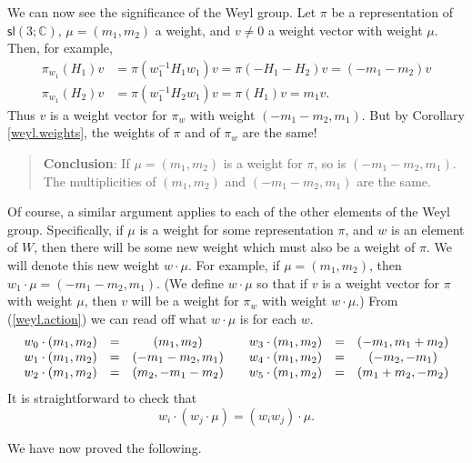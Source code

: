 \documentclass[12pt]{amsbook}
\theoremstyle{plain}
\numberwithin{equation}{chapter}
\numberwithin{theorem}{chapter}
\begin{document}
We can now see the significance of the Weyl group. Let $\pi$ be a
representation of $\mathsf{sl}\left(  3;\mathbb{C}\right)  $, $\mu
=(m_{1},m_{2})$ a weight, and $v\neq0$ a weight vector with weight $\mu$.
Then, for example,
\begin{align*}
\pi_{w_{1}}(H_{1})v  & =\pi(w_{1}^{-1}H_{1}w_{1})v=\pi(-H_{1}-H_{2}%
)v=(-m_{1}-m_{2})v\\
\pi_{w_{1}}(H_{2})v  & =\pi(w_{1}^{-1}H_{2}w_{1})v=\pi(H_{1})v=m_{1}v\text{.}%
\end{align*}
Thus $v$ is a weight vector for $\pi_{w}$ with weight $(-m_{1}-m_{2},m_{1})$.
But by Corollary \ref{weyl.weights}, the weights of $\pi$ and of $\pi_{w}$ are
the same!

\begin{quote}
\textbf{Conclusion}: If $\mu=(m_{1},m_{2})$ is a weight for $\pi$, so is
$(-m_{1}-m_{2},m_{1})$. The multiplicities of $(m_{1},m_{2})$ and
$(-m_{1}-m_{2},m_{1})$ are the same.
\end{quote}

Of course, a similar argument applies to each of the other elements of the
Weyl group. Specifically, if $\mu$ is a weight for some representation $\pi$,
and $w$ is an element of $W$, then there will be some new weight which must
also be a weight of $\pi$. We will denote this new weight $w\cdot\mu$. For
example, if $\mu=(m_{1},m_{2})$, then $w_{1}\cdot\mu=(-m_{1}-m_{2},m_{1})$.
(We define $w\cdot\mu$ so that if $v$ is a weight vector for $\pi$ with weight
$\mu$, then $v$ will be a weight for $\pi_{w}$ with weight $w\cdot\mu$.) From
(\ref{weyl.action}) we can read off what $w\cdot\mu$ is for each $w$.
\begin{equation}%
\begin{array}
[c]{ccccccc}%
w_{0}\cdot(m_{1},m_{2}) & = & (m_{1},m_{2}) &  & w_{3}\cdot(m_{1},m_{2}) & = &
(-m_{1},m_{1}+m_{2})\\
w_{1}\cdot(m_{1},m_{2}) & = & (-m_{1}-m_{2},m_{1}) &  & w_{4}\cdot(m_{1}%
,m_{2}) & = & (-m_{2},-m_{1})\\
w_{2}\cdot(m_{1},m_{2}) & = & (m_{2},-m_{1}-m_{2}) &  & w_{5}\cdot(m_{1}%
,m_{2}) & = & (m_{1}+m_{2},-m_{2})
\end{array}
\label{w.act}%
\end{equation}
It is straightforward to check that
\begin{equation}
w_{i}\cdot(w_{j}\cdot\mu)=(w_{i}w_{j})\cdot\mu\text{.}\label{w.group}%
\end{equation}

We have now proved the following.
\end{document}
